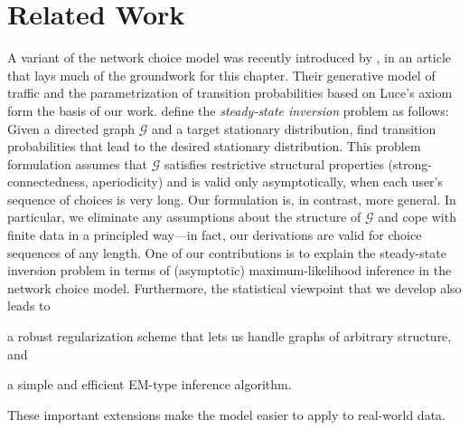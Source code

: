 \section{Related Work}  %
\label{cr:sec:relwork}

A variant of the network choice model was recently introduced by \citet{kumar2015inverting}, in an article that lays much of the groundwork for this chapter.
Their generative model of traffic and the parametrization of transition probabilities based on Luce's axiom form the basis of our work.
\citeauthor{kumar2015inverting} define the \emph{steady-state inversion} problem as follows:
Given a directed graph $\mathcal{G}$ and a target stationary distribution, find transition probabilities that lead to the desired stationary distribution.
This problem formulation assumes that $\mathcal{G}$ satisfies restrictive structural properties (strong-connectedness, aperiodicity) and is valid only asymptotically, when each user's sequence of choices is very long.
Our formulation is, in contrast, more general.
In particular, we eliminate any assumptions about the structure of $\mathcal{G}$ and cope with finite data in a principled way---in fact, our derivations are valid for choice sequences of any length.
One of our contributions is to explain the steady-state inversion problem in terms of (asymptotic) maximum-likelihood inference in the network choice model.
Furthermore, the statistical viewpoint that we develop also leads to
\begin{enuminline}
\item a robust regularization scheme that lets us handle graphs of arbitrary structure, and
\item a simple and efficient EM-type inference algorithm.
\end{enuminline}
These important extensions make the model easier to apply to real-world data.

